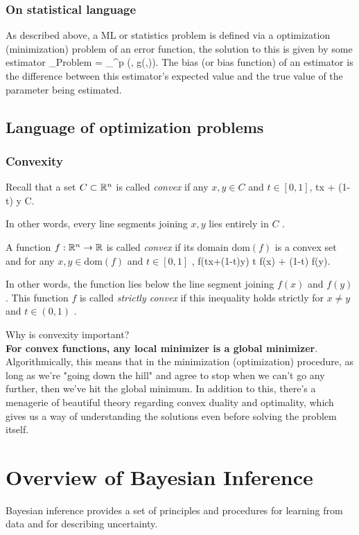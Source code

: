 \subsubsection{On statistical language}
As described above, a ML or statistics problem is defined via a optimization (minimization) problem of an error function, the solution to this is given by some estimator
\be 
\hat{\mw}_{Problem} = \arg \min_{\mw \in \mR^p} \mC(\mX, g(\mw,\my)).
\ee 
The bias (or bias function) of an estimator is the difference between this estimator's expected value and the true value of the parameter being estimated.


\subsection{Language of optimization problems}
\subsubsection{Convexity}
Recall that a set $C\subset\mathbb{R}^n$ is called \emph{convex} if any  $x,y\in C$  and  $t\in [0,1]$,
\bse 
tx + (1-t) y \in C.
\ese 

In other words, every line segments joining  $x,y$  lies entirely in  $C$ .

A function $f:\mathbb{R}^n \rightarrow \mathbb{R}$ is called \emph{convex} if its domain $\text{dom}(f)$  is a convex set and for any  $x,y\in \text{dom}(f)$  and $ t\in[0,1]$ ,
\bse 
f(tx+(1-t)y) \leq t f(x) + (1-t) f(y).
\ese 

In other words, the function lies below the line segment joining $ f(x)$  and $ f(y)$ . This function  $f$  is called \emph{strictly convex} if this inequality holds strictly for  $x \neq y$  and  $t \in (0,1)$ .
\begin{mybox}{}
Why is convexity important? \\
\textbf{For convex functions, any local minimizer is a global minimizer}. Algorithmically, this means that in the minimization (optimization) procedure, as long as we're "going down the hill" and agree to stop when we can't go any further, then we've hit the global minimum. In addition to this, there's a menagerie of beautiful theory regarding convex duality and optimality, which gives us a way of understanding the solutions even before solving the problem itself.
\end{mybox}


\section{Overview of Bayesian Inference}
\label{sec:bayes}
Bayesian inference provides a set of principles and procedures for learning from data and for describing uncertainty.
